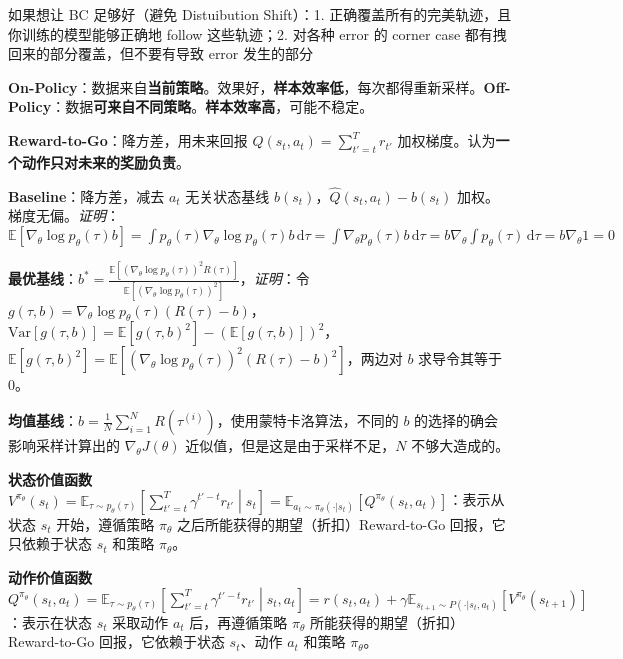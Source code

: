 \documentclass[
  8pt]{extarticle}
\begin{document}
\begin{multicols*}{4}
如果想让 BC 足够好（避免 Distuibution Shift）：1.
正确覆盖所有的完美轨迹，且你训练的模型能够正确地 follow 这些轨迹；2.
对各种 error 的 corner case 都有拽回来的部分覆盖，但不要有导致 error
发生的部分

\textbf{On-Policy}：数据来自\textbf{当前策略}。效果好，\textbf{样本效率低}，每次都得重新采样。\textbf{Off-Policy}：数据\textbf{可来自不同策略}。\textbf{样本效率高}，可能不稳定。

\textbf{Reward-to-Go}：降方差，用未来回报
\(\hat{Q}(s_t, a_t) = \sum_{t'=t}^{T} r_{t'}\)
加权梯度。认为\textbf{一个动作只对未来的奖励负责}。

\textbf{Baseline}：降方差，减去 \(a_t\) 无关状态基线
\(b(s_t)\)，\(\hat{Q}(s_t, a_t) - b(s_t)\)
加权。梯度无偏。\emph{证明}：\(\mathbb{E}[\nabla_\theta \log p_\theta(\tau) b] = \int p_\theta(\tau) \nabla_\theta \log p_\theta(\tau) b \, \mathrm{d}\tau = \int \nabla_\theta p_\theta(\tau) b \, \mathrm{d}\tau = b \nabla_\theta \int p_\theta(\tau) \, \mathrm{d}\tau = b \nabla_\theta 1 = 0\)

\textbf{最优基线}：\(b^* = \frac{\mathbb{E}[(\nabla_\theta \log p_\theta(\tau))^2 R(\tau)]}{\mathbb{E}[(\nabla_\theta \log p_\theta(\tau))^2]}\)，\emph{证明}：令
\(g(\tau, b) = \nabla_\theta \log p_\theta(\tau) (R(\tau) - b)\)，\(\mathrm{Var}[g(\tau, b)] = \mathbb{E}[g(\tau, b)^2] - (\mathbb{E}[g(\tau, b)])^2\)，\(\mathbb{E}[g(\tau, b)^2] = \mathbb{E}[(\nabla_\theta \log p_\theta(\tau))^2 (R(\tau) - b)^2]\)，两边对
\(b\) 求导令其等于 0。

\textbf{均值基线}：\(b = \frac{1}{N} \sum_{i=1}^N R(\tau^{(i)})\)，使用蒙特卡洛算法，不同的
\(b\) 的选择的确会影响采样计算出的 \(\nabla_\theta J(\theta)\)
近似值，但是这是由于采样不足，\(N\) 不够大造成的。

\textbf{状态价值函数}
\(V^{\pi_\theta}(s_t) = \mathbb{E}_{\tau \sim p_\theta(\tau)} \left[ \sum_{t'=t}^{T} \gamma^{t'-t} r_{t'} \middle| s_t \right] = \mathbb{E}_{a_t \sim \pi_\theta(\cdot|s_t)} [Q^{\pi_\theta}(s_t, a_t)]\)：表示从状态
\(s_t\) 开始，遵循策略 \(\pi_\theta\)
之后所能获得的期望（折扣）Reward-to-Go 回报，它只依赖于状态 \(s_t\)
和策略 \(\pi_\theta\)。

\textbf{动作价值函数}
\(Q^{\pi_\theta}(s_t, a_t) = \mathbb{E}_{\tau \sim p_\theta(\tau)} \left[ \sum_{t'=t}^{T} \gamma^{t'-t} r_{t'} \middle| s_t, a_t \right] = r(s_t, a_t) + \gamma \mathbb{E}_{s_{t+1} \sim P(\cdot|s_t, a_t)} [V^{\pi_\theta}(s_{t+1})]\)：表示在状态
\(s_t\) 采取动作 \(a_t\) 后，再遵循策略 \(\pi_\theta\)
所能获得的期望（折扣）Reward-to-Go 回报，它依赖于状态 \(s_t\)、动作
\(a_t\) 和策略 \(\pi_\theta\)。


\end{multicols*}
\end{document}
